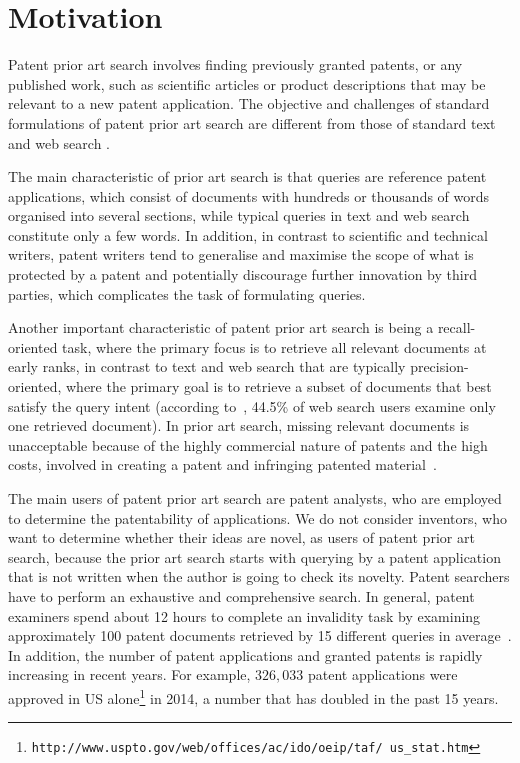 \section{Motivation}
\label{sec:Motivation}
Patent prior art search involves finding previously granted patents,
or any published work, such as scientific articles or product
descriptions that may be relevant to a new patent application. 
The objective and challenges of standard formulations of patent prior art
search are different from those of standard text and web search \citep{magdy2012toward}.

The main characteristic of prior art search is that queries are reference patent
applications, which consist of documents with hundreds or thousands of
words organised into several sections, while typical queries in text
and web search constitute only a few words. 
In addition, in contrast to scientific and technical writers, patent writers
tend to generalise and maximise the scope of what is protected by a
patent and potentially discourage further innovation by third parties,
which complicates the task of formulating queries. 

Another important characteristic of patent prior art
search is being a recall-oriented task, where the primary focus is to
retrieve all relevant documents at early ranks, in contrast to text
and web search that are typically precision-oriented, where the primary goal is
to retrieve a subset of documents that best satisfy the query
intent (according to~\citep{zhang2010search}, 44.5\% of web search users examine only one retrieved document). 
In prior art search, missing relevant documents is unacceptable because of the highly commercial nature of patents and the high costs, involved
in creating a patent and infringing patented material~\citep{joho2010survey}.  

The main users of patent prior art search are 
patent analysts, who are employed to determine the patentability 
of applications. We do not consider inventors, who want to determine whether their ideas are novel, as users of patent prior art search, because the prior art search starts with querying by a patent application that is not written when the author is going to check its novelty.
Patent searchers have to perform an exhaustive and comprehensive search. In general, patent
examiners spend about 12 hours to complete an invalidity task by examining
approximately 100 patent documents retrieved by 15 different queries in average~\citep{joho2010survey}. 
In addition, the number of patent applications and granted patents is rapidly increasing in recent years. For example, $326,033$ patent applications were approved in US alone\footnote{\texttt{http://www.uspto.gov/web/offices/ac/ido/oeip/taf/ us\_stat.htm}} in 2014, a number that has doubled in the past 15 years.

